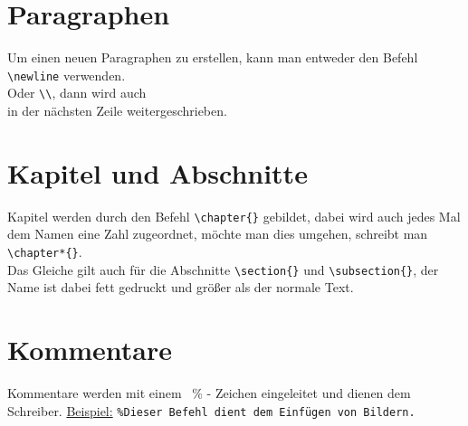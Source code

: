 \documentclass[ngerman]{scrreport}
\begin{document}
\section{Paragraphen}
Um einen neuen Paragraphen zu erstellen, kann man entweder den Befehl {\color{blue}\verb|\newline|} \newline verwenden.\\ Oder {\color{blue}\verb|\\|}, dann wird auch \\ in der nächsten Zeile weitergeschrieben.

\section{Kapitel und Abschnitte}
Kapitel werden durch den Befehl {\color{blue}\verb|\chapter{}|} gebildet, dabei wird auch jedes Mal dem Namen eine Zahl zugeordnet, möchte man dies umgehen, schreibt man {\color{blue}\verb|\chapter*{}|}.\\
Das Gleiche gilt auch für die Abschnitte {\color{blue}\verb|\section{}|} und {\color{blue}\verb|\subsection{}|}, der Name ist dabei fett gedruckt und größer als der normale Text.

\section{Kommentare}
Kommentare werden mit einem {\color{blue}\ \%} - Zeichen eingeleitet und dienen dem Schreiber.
\newline
\underline{Beispiel:} {\color{blue}\verb|%Dieser Befehl dient dem Einfügen von Bildern.|}
\end{document}
